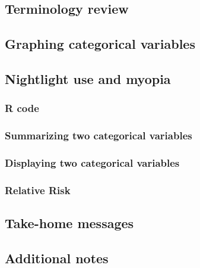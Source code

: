 \documentclass[
]{report}
\begin{document}
\subsection{Terminology review}\label{terminology-review-15}

\subsection{Graphing categorical variables}\label{graphing-categorical-variables}

\subsection*{Nightlight use and myopia}\label{nightlight-use-and-myopia}

\subsubsection*{R code}\label{r-code-1}

\subsubsection*{Summarizing two categorical variables}\label{summarizing-two-categorical-variables}

\subsubsection*{Displaying two categorical variables}\label{displaying-two-categorical-variables}

\subsubsection*{Relative Risk}\label{relative-risk}

\subsection{Take-home messages}\label{take-home-messages-16}

\subsection{Additional notes}\label{additional-notes-16}
\end{document}
